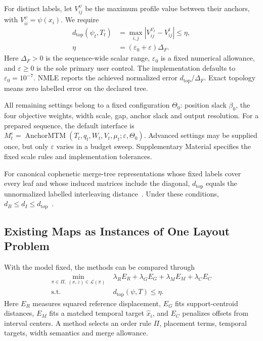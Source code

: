\documentclass[review]{vgtc}
\newcommand{\dtop}{d_{\mathrm{top}}}
\begin{document}
For distinct labels, let $V_{ij}^{\psi}$ be the maximum profile value between their anchors, with $V_{ii}^{\psi}=\psi(x_i)$. We require
\begin{equation}\label{eq:dtop}
\begin{aligned}
 \dtop(\psi_t,T_t)&=\max_{i,j}|V_{ij}^{\psi_t}-V_{ij}^t|\le\eta,\\
 \eta&=(\varepsilon_0+\varepsilon)\Delta_F.
\end{aligned}
\end{equation}
Here $\Delta_F>0$ is the sequence-wide scalar range, $\varepsilon_0$ is a fixed numerical allowance, and $\varepsilon\ge0$ is the sole primary user control. The implementation defaults to $\varepsilon_0=10^{-7}$. NMLE reports the achieved normalized error $\dtop/\Delta_F$. Exact topology means zero labelled error on the declared tree.

All remaining settings belong to a fixed configuration $\Theta_0$: position slack $\beta_0$, the four objective weights, width scale, gap, anchor slack and output resolution. For a prepared sequence, the default interface is $M_t^\varepsilon=\operatorname{AnchorMTM}(T_t,q_t,W_t,V_t,\mu_t;\varepsilon,\Theta_0)$. Advanced settings may be supplied once, but only $\varepsilon$ varies in a budget sweep. Supplementary Material specifies the fixed scale rules and implementation tolerances.

For canonical cophenetic merge-tree representations whose fixed labels cover every leaf and whose induced matrices include the diagonal, $\dtop$ equals the unnormalized labelled interleaving distance~\cite{Munch:2019:LINF,Gasparovic:2024:IID}. Under these conditions, $d_B\le d_I\le\dtop$~\cite{Morozov:2013:IDMT}. 



\subsection{Existing Maps as Instances of One Layout Problem}\label{sec:common}
With the model fixed, the methods can be compared through
\begin{equation}\label{eq:family}
\begin{aligned}
\min_{\pi\in\Pi,\;(x,z)\in\mathcal{L}(\pi)}\;&\lambda_R E_R+\lambda_G E_G+\lambda_M E_M+\lambda_C E_C\\
\mathrm{s.t.}\;&\dtop(\psi,T)\le\eta.
\end{aligned}
\end{equation}
Here $E_R$ measures squared reference displacement, $E_G$ fits support-centroid distances, $E_M$ fits a matched temporal target $\hat x_i$, and $E_C$ penalizes offsets from interval centers. A method selects an order rule $\Pi$, placement terms, temporal targets, width semantics and merge allowance. 
\end{document}
